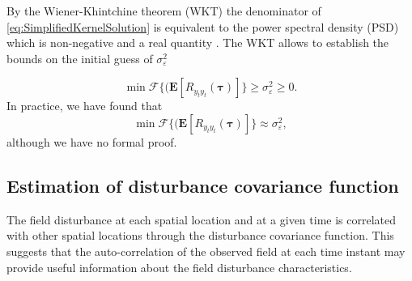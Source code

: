 \documentclass[10pt,twocolumn,twoside]{IEEEtran}
\newcommand{\parham}[1]{\textsf{\emph{\textbf{\textcolor{blue}{#1}}}}}
\begin{document}

By the Wiener-Khintchine theorem (WKT) the denominator of \eqref{eq:SimplifiedKernelSolution} is equivalent to the power spectral density (PSD) which is non-negative and a real quantity \cite{Ricker2003}.
The WKT allows to establish the bounds on the initial guess of $\sigma_{\varepsilon}^2$

\begin{equation}\label{eq:BoundOnObsVariance}   
  \min\mathcal{F}\{(\mathbf{E}\left[R_{y_ty_t}(\boldsymbol\tau)\right]\}\ge\sigma_{\varepsilon}^2\ge0.
\end{equation}
In practice, we have found that 
\begin{equation}
	\min\mathcal{F}\{(\mathbf{E}\left[R_{y_ty_t}(\boldsymbol\tau)\right]\}\approx\sigma_{\varepsilon}^2,
\end{equation}
although we have no formal proof.


\subsection{Estimation of disturbance covariance function}
The field disturbance at each spatial location and at a given time is correlated with other spatial locations through the disturbance covariance
function.
This suggests that the auto-correlation of the observed field at each time instant may provide useful information about the field disturbance characteristics.
\end{document}
